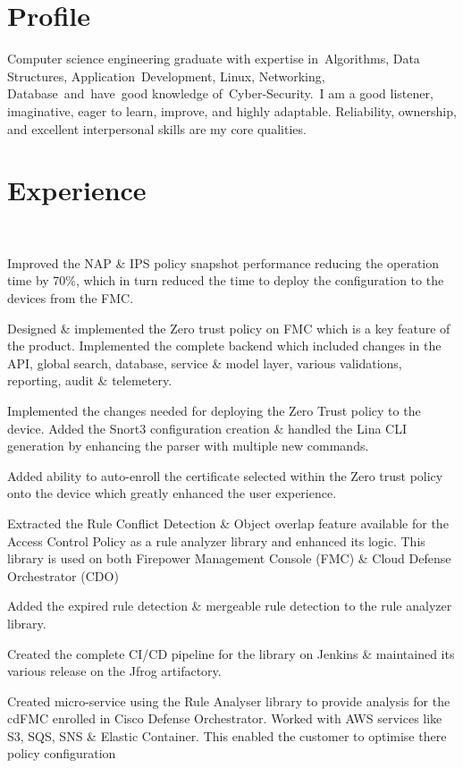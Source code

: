 \documentclass[]{hieudo-build}
\begin{document}
\begin{minipage}[t]{0.65\textwidth} 

\section{Profile}
Computer science engineering graduate with expertise in Algorithms, Data Structures, Application Development, Linux, Networking, Database and have good knowledge of Cyber-Security. I am a good listener, imaginative, eager to learn, improve, and highly adaptable. Reliability, ownership, and excellent interpersonal skills are my core qualities.

\sectionsep

\section{Experience}

\\
\vspace{0.9em} %
\begin{tightemize}
 \item Improved the NAP \& IPS policy snapshot performance reducing the operation time by 70\%, which in turn reduced the time to deploy the configuration to the devices from the FMC.
 \item Designed \& implemented the Zero trust policy on FMC which is a key feature of the product. Implemented the complete backend which included changes in the API, global search, database,  service \& model layer, various validations, reporting, audit \& telemetery. 
 \item Implemented the changes needed for deploying the Zero Trust policy to the device. Added the Snort3 configuration creation \& handled the Lina CLI generation by enhancing the parser with multiple new commands.
 \item Added ability to auto-enroll the certificate selected within the Zero trust policy onto the device which greatly enhanced the user experience.
 \item Extracted the Rule Conflict Detection \& Object overlap feature available for the Access Control Policy as a rule analyzer library and enhanced its logic. This library is used on both Firepower Management Console (FMC) \& Cloud Defense Orchestrator (CDO)
 \item Added the expired rule detection \& mergeable rule detection to the rule analyzer library. 
 \item Created the complete CI/CD pipeline for the library on Jenkins \& maintained its various release on the Jfrog artifactory.
 \item Created micro-service using the Rule Analyser library to provide analysis for the cdFMC enrolled in Cisco Defense Orchestrator. Worked with AWS services like S3, SQS, SNS \& Elastic Container. This enabled the customer to optimise there policy configuration
\end{tightemize}




\end{minipage}
\end{document}
